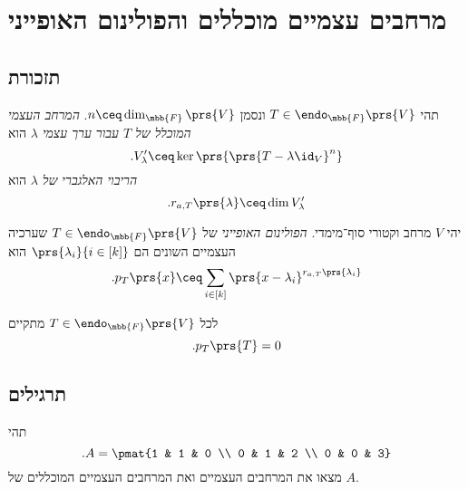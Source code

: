 \documentclass[a4paper,10pt,oneside,openany]{article}
\begin{document}
\section{מרחבים עצמיים מוכללים והפולינום האופייני}

\subsection{תזכורת}

\begin{definition}
תהי
$T \in \endo_{\mbb{F}}\prs{V}$
ונסמן
$n \ceq \dim_{\mbb{F}}\prs{V}$.
\emph{המרחב העצמי המוכלל של
$T$
עבור ערך עצמי
$\lambda$}
הוא
\[\text{.} V_{\lambda}' \ceq \ker \prs{\prs{T-\lambda \id_V}^{n}}\]
\emph{הריבוי האלגברי של
$\lambda$}
הוא
\[\text{.} r_{a,T}\prs{\lambda} \ceq \dim V_{\lambda}'\]
\end{definition}

\begin{definition}
יהי
$V$
מרחב וקטורי סוף־מימדי.
\emph{הפולינום האופייני}
של
$T \in \endo_{\mbb{F}}\prs{V}$
שערכיה העצמיים השונים הם
$\prs{\lambda_i}{i \in [k]}$
הוא
\begin{align*}
\text{.} p_T\prs{x} \ceq \sum_{i \in [k]} \prs{x-\lambda_i}^{r_{a,T}\prs{\lambda_i}}
\end{align*}
\end{definition}

\begin{theorem}
לכל
$T \in \endo_{\mbb{F}}\prs{V}$
מתקיים
\[\text{.} p_T\prs{T} = 0\]
\end{theorem}

\subsection{תרגילים}

\begin{exercise}
תהי
\[\text{.} A = \pmat{1 & 1 & 0 \\ 0 & 1 & 2 \\ 0 & 0 & 3}\]
מצאו את המרחבים העצמיים ואת המרחבים העצמיים המוכללים של
$A$.
\end{exercise}
\end{document}
